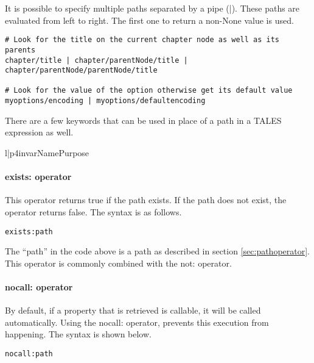 It is possible to specify multiple paths separated by a pipe (|).
These paths are evaluated from left to right.  The first one to return
a non-None value is used.
\begin{verbatim}
# Look for the title on the current chapter node as well as its parents
chapter/title | chapter/parentNode/title | chapter/parentNode/parentNode/title

# Look for the value of the option otherwise get its default value
myoptions/encoding | myoptions/defaultencoding
\end{verbatim}

There are a few keywords that can be used in place of a path in a
TALES expression as well.
\begin{tableii}{l|p{4in}}{var}{Name}{Purpose}
\end{tableii}


\paragraph{exists: operator}

This operator returns true if the path exists.  If the path does not exist,
the operator returns false.   The syntax is as follows.
\begin{verbatim}
exists:path
\end{verbatim}

The ``path'' in the code above is a path as described in section 
\ref{sec:pathoperator}.  This operator is commonly combined with the
not: operator.


\paragraph{nocall: operator}

By default, if a property that is retrieved is callable, it will be
called automatically.  Using the nocall: operator, prevents this 
execution from happening.  The syntax is shown below.
\begin{verbatim}
nocall:path
\end{verbatim}


